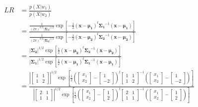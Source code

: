\documentclass[12pt]{article}
\begin{document}
\begin{enumerate}
\begin{enumerate}
\begin{figure}[H]
    \begin{equation}
    \begin{split}
      LR& = \frac{p(X|w_1)}{p(X|w_2)} \\
      & = \frac{\frac{1}{(2\pi)^{d/2}|\boldsymbol{\Sigma_1}|^{1/2}} \exp\left[-\frac{1}{2}(\mathbf{x}-\boldsymbol{\mu_1})^t\boldsymbol{\Sigma_1}^{-1}(\mathbf{x}-\boldsymbol{\mu_1})\right]}{\frac{1}{(2\pi)^{d/2}|\boldsymbol{\Sigma_2}|^{1/2}} \exp\left[-\frac{1}{2}(\mathbf{x}-\boldsymbol{\mu_2})^t\boldsymbol{\Sigma_2}^{-1}(\mathbf{x}-\boldsymbol{\mu_2})\right]} \\
      & = \frac{|\boldsymbol{\Sigma_2}|^{1/2} \exp\left[\frac{1}{2}(\mathbf{x}-\boldsymbol{\mu_2})^t\boldsymbol{\Sigma_2}^{-1}(\mathbf{x}-\boldsymbol{\mu_2})\right]}{|\boldsymbol{\Sigma_1}|^{1/2} \exp\left[\frac{1}{2}(\mathbf{x}-\boldsymbol{\mu_1})^t\boldsymbol{\Sigma_1}^{-1}(\mathbf{x}-\boldsymbol{\mu_1})\right]} \\
      & = \frac{|[\begin{array}{ll}1&1\\1&2\end{array}]|^{1/2} \exp\left[\frac{1}{2}([\begin{array}{l}x_1\\x_2\end{array}]-[\begin{array}{c}1\\-2\end{array}])^t[\begin{array}{ll}1&1\\1&2\end{array}]^{-1}([\begin{array}{l}x_1\\x_2\end{array}]-[\begin{array}{c}1\\-2\end{array}])\right]}{|[\begin{array}{ll}2&1\\1&1\end{array}]|^{1/2} \exp\left[\frac{1}{2}([\begin{array}{l}x_1\\x_2\end{array}]-[\begin{array}{c}1\\2\end{array}])^t[\begin{array}{ll}2&1\\1&1\end{array}]^{-1}([\begin{array}{l}x_1\\x_2\end{array}]-[\begin{array}{c}1\\2\end{array}])\right]} \\

\end{split}
\end{equation}
\end{figure}
\end{enumerate}
\end{enumerate}
\end{document}
